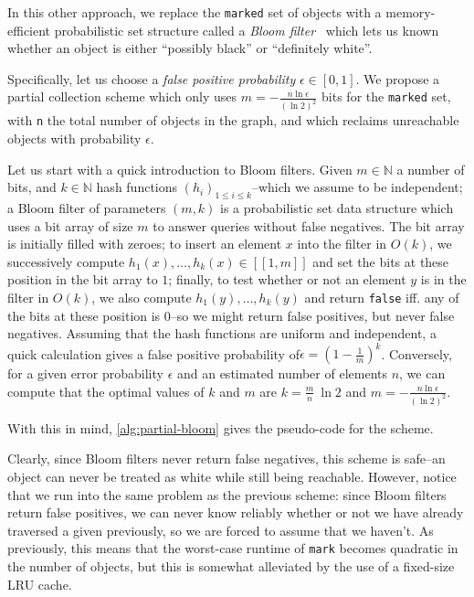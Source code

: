 In this other approach, we replace the \texttt{marked} set of objects with a memory-efficient probabilistic set structure called a \emph{Bloom filter}~\cite{bloom70} which lets us known whether an object is either ``possibly black'' or ``definitely white''.

Specifically, let us choose a \emph{false positive probability} \(\epsilon \in [0, 1]\). We propose a partial collection scheme which only uses \(m = -\frac{n\ln{\epsilon}}{(\ln{2})^2}\) bits for the \texttt{marked} set, with \texttt{n} the total number of objects in the graph, and which reclaims unreachable objects with probability \(\epsilon\).

\bigskip
Let us start with a quick introduction to Bloom filters. Given \(m \in \mathbb{N}\) a number of bits, and \(k \in \mathbb{N}\) hash functions \((h_i)_{1 \leq i \leq k}\)--which we assume to be independent; a Bloom filter of parameters \((m, k)\) is a probabilistic set data structure which uses a bit array of size \(m\) to answer queries without false negatives. The bit array is initially filled with zeroes; to insert an element \(x\) into the filter in \(O(k)\), we successively compute \(h_1(x), \dots, h_k(x) \in [[1, m]]\) and set the bits at these position in the bit array to \(1\); finally, to test whether or not an element \(y\) is in the filter in \(O(k)\), we also compute \(h_1(y), \dots, h_k(y)\) and return \texttt{false} iff. any of the bits at these position is \(0\)--so we might return false positives, but never false negatives. Assuming that the hash functions are uniform and independent, a quick calculation gives a false positive probability of\(\epsilon = (1 - \frac{1}{m})^k\). Conversely, for a given error probability \(\epsilon\) and an estimated number of elements \(n\), we can compute that the optimal values of \(k\) and \(m\) are \(k = \frac{m}{n} \ \ln{2}\) and \(m = -\frac{n \ln{\epsilon}}{(\ln{2})^2}\).

\bigskip
With this in mind, \cref{alg:partial-bloom} gives the pseudo-code for the scheme.



\bigskip
Clearly, since Bloom filters never return false negatives, this scheme is safe--an object can never be treated as white while still being reachable. However, notice that we run into the same problem as the previous scheme: since Bloom filters return false positives, we can never know reliably whether or not we have already traversed a given previously, so we are forced to assume that we haven't. As previously, this means that the worst-case runtime of \texttt{mark} becomes quadratic in the number of objects, but this is somewhat alleviated by the use of a fixed-size LRU cache.

